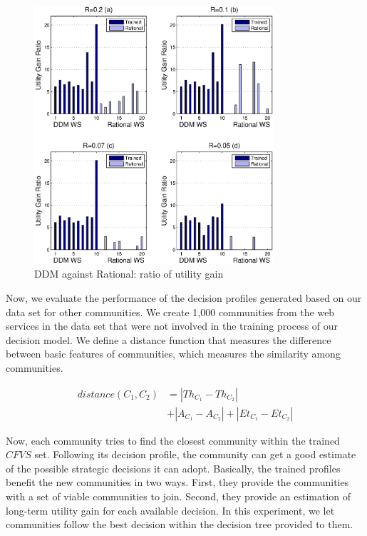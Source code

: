 {\begin{figure}%
\centering
\includegraphics[width=3.5in]{figures/utility_ratio.eps}
\caption{DDM against Rational: ratio of utility gain}
\label{utility_gain_mlisa_and_rational_ratio}
\end{figure}

Now, we evaluate the performance of the decision profiles generated based on our data set for other communities.%
We create 1,000 communities from the web services in the data set that were not involved in the training process of our decision model. We define a distance function that measures the difference between basic features of communities, which measures the similarity among communities.

\begin{equation}\label{distance_c}
\begin{split}
distance (C_1, C_2) & = |Th_{C_1} - Th_{C_2}| \\
                    & + |A_{C_1} - A_{C_2}| + |Et_{C_1} - Et_{C_2}|
\end{split}
\end{equation}

Now, each community tries to find the closest community within the trained $CFVS$ set. Following its decision profile, the community can get a good estimate of the possible strategic decisions it can adopt. Basically, the trained profiles benefit the new communities in two ways. First, they provide the communities with a set of viable communities to join. Second, they provide an estimation of long-term utility gain for each available decision. In this experiment, we let communities follow the best decision within the decision tree provided to them.


}
